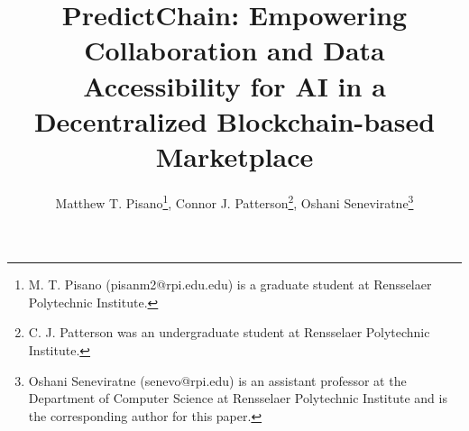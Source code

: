\documentclass{ledger}
\title{\Large{PredictChain: Empowering Collaboration and Data Accessibility for AI in a Decentralized Blockchain-based Marketplace}}
\author{\normalsize{Matthew T. Pisano\thanks{M. T. Pisano (pisanm2@rpi.edu.edu) is a graduate
    student at Rensselaer Polytechnic Institute.}, Connor J. Patterson\thanks{C. J. Patterson was an undergraduate student at
    Rensselaer Polytechnic Institute.}, Oshani Seneviratne\thanks{Oshani Seneviratne (senevo@rpi.edu) is an assistant professor at the Department of Computer Science at Rensselaer Polytechnic Institute and is the corresponding author for this paper.}}}
\begin{document}
\maketitle

\thispagestyle{pagefirst}

\begin{abstract}






\end{abstract}
\end{document}
